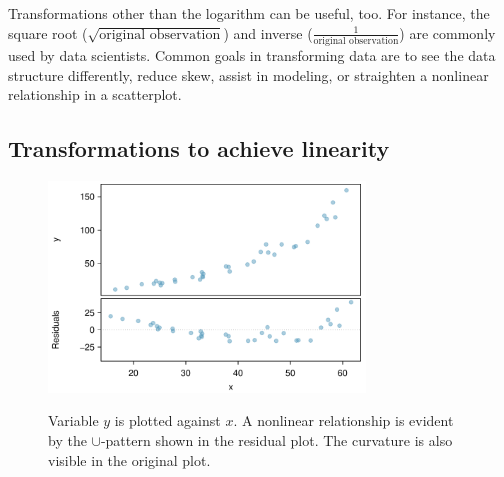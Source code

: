 Transformations other than the logarithm can be useful, too.
For instance, the square root
($\sqrt{\text{original observation}}$) and inverse
($\frac{1}{\text{original observation}}$) are commonly used
by data scientists.
Common goals in transforming data are to see the data
structure differently, reduce skew, assist in modeling,
or straighten a nonlinear relationship in a scatterplot.



\newpage
\subsection{Transformations to achieve linearity}

\begin{figure}[ht]
   \begin{center}
   \includegraphics[width=0.75\textwidth]{ch_regr_simple_linear/figures/NeedsTransform/NeedsTransform-PreTransform}
\label{pretransform}
   \caption{Variable $y$ is plotted against $x$. A nonlinear relationship is evident by the $\cup$-pattern shown in the residual plot.  The curvature is also visible in the original plot.}
   \label{NeedsTransform-PreTransform}
\end{center}
\end{figure}


